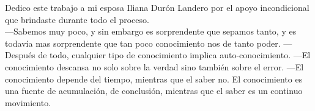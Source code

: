 
%






Dedico este trabajo a mi esposa Iliana Dur\'on Landero por el apoyo incondicional
que brindaste durante todo el proceso.\\


---Sabemos muy poco, y sin embargo es
sorprendente que sepamos tanto, y es todav\'ia mas sorprendente que tan poco
conocimiento nos de tanto poder.
---Despu\'es de todo, cualquier tipo de conocimiento implica auto-conocimiento.
---El conocimiento descansa no solo sobre la verdad sino tambi\'en sobre el error.
---El conocimiento depende del tiempo, mientras que el saber no. El
conocimiento es una fuente de acumulaci\'on, de conclusión, mientras que el saber
es un continuo movimiento.


